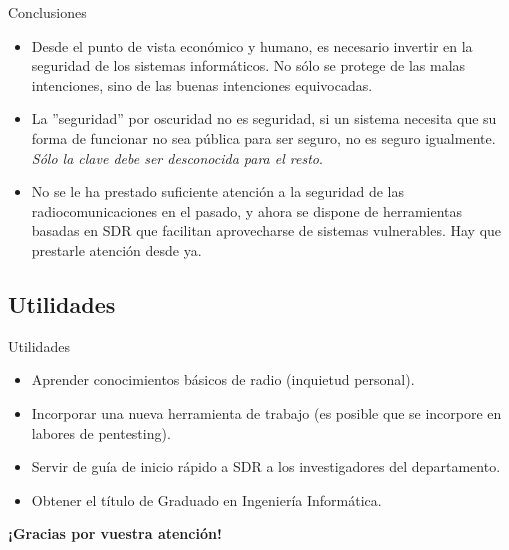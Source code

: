 \documentclass{beamer}
\begin{document}
\begin{frame}{Conclusiones}

\begin{itemize}
	\item Desde el punto de vista económico y humano, es necesario invertir en la seguridad de los sistemas informáticos. No sólo se protege de las malas intenciones, sino de las buenas intenciones equivocadas.
	\item La ''seguridad'' por oscuridad no es seguridad, si un sistema necesita que su forma de funcionar no sea pública para ser seguro, no es seguro igualmente. \emph{Sólo la clave debe ser desconocida para el resto}.
	\item No se le ha prestado suficiente atención a la seguridad de las radiocomunicaciones en el pasado, y ahora se dispone de herramientas basadas en SDR que facilitan aprovecharse de sistemas vulnerables. Hay que prestarle atención desde ya.
\end{itemize}

\end{frame}

\subsection{Utilidades}

\begin{frame}{Utilidades}

\begin{itemize}
\setlength{\itemsep}{12pt}
	\item Aprender conocimientos básicos de radio (inquietud personal).
	\item Incorporar una nueva herramienta de trabajo (es posible que se incorpore en labores de pentesting).
	\item Servir de guía de inicio rápido a SDR a los investigadores del departamento.
	\item Obtener el título de Graduado en Ingeniería Informática.
\end{itemize}

\end{frame}

\begin{frame}

\begin{center}
\textbf{¡Gracias por vuestra atención!}
\end{center}

\end{frame}
\end{document}
